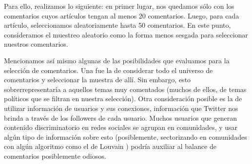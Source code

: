 Para ello, realizamos lo siguiente: en primer lugar, nos quedamos sólo con los comentarios cuyos artículos tengan al menos 20 comentarios. Luego, para cada artículo, seleccionamos aleatoriamente hasta 50 comentarios. En este punto, consideramos el muestreo aleatorio como la forma menos sesgada para seleccionar nuestros comentarios.

Mencionamos así mismo algunas de las posibilidades que evaluamos para la selección de comentarios. Una fue la de considerar todo el universo de comentarios y seleccionar la muestra de allí. Sin embargo, esto sobrerrepresentaría a aquellos temas muy comentados (muchos de ellos, de temas políticos que se filtran en nuestra selección). Otra consideración posible es la de utilizar información de usuarios y sus conexiones, información que Twitter nos brinda a través de los followers de cada usuario. Muchos usuarios que generan contenido discriminatorio en redes sociales se agrupan en comunidades, y usar algún tipo de información sobre esto (posiblemente, sectorizando en comunidades con algún algoritmo como el de Louvain \cite{blondel2008fast}) podría auxiliar al balance de comentarios posiblemente odiosos.
